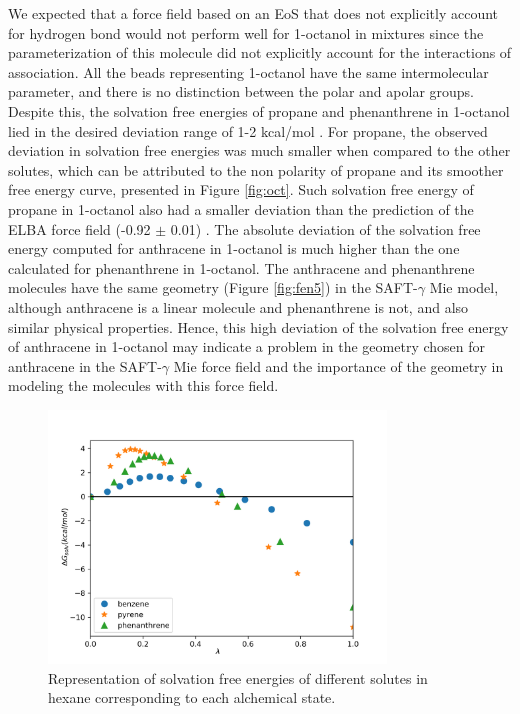 We expected that a force field based on an EoS that does not explicitly account for hydrogen bond would not perform well for 1-octanol in mixtures since the parameterization of this molecule did not explicitly account for the interactions of association. All the beads representing 1-octanol have the same intermolecular parameter, and there is no distinction between the polar and apolar groups. Despite this, the solvation free energies of propane and phenanthrene in 1-octanol lied in the desired deviation range of 1-2 kcal/mol \cite{doimobley}. For propane, the observed deviation in solvation free energies was much smaller when compared to the other solutes, which can be attributed to the non polarity of propane and its smoother free energy curve, presented in Figure \ref{fig:oct}. Such solvation free energy of propane in 1-octanol also had a smaller deviation than the prediction of the ELBA force field (-0.92 $\pm$ 0.01) \cite{doi:10.1021/acs.jctc.5b00963}. The absolute deviation of the solvation free energy computed for anthracene in 1-octanol is much higher than the one calculated for phenanthrene in 1-octanol. The anthracene and phenanthrene molecules have the same geometry (Figure \ref{fig:fen5}) in the SAFT-$\gamma$ Mie model, although anthracene is a linear molecule and phenanthrene is not, and also similar physical properties. Hence, this high deviation of the solvation free energy of anthracene in 1-octanol may indicate a problem in the geometry chosen for anthracene in the SAFT-$\gamma$ Mie force field and the importance of the geometry in modeling the molecules with this force field.      
\FloatBarrier
\begin{figure}[H]
	\centering
	\includegraphics[width=0.8\textwidth]{Figures/hex}
	\caption{Representation of solvation free energies of different solutes in hexane corresponding to each alchemical state.}
	\label{fig:hex}
\end{figure}

